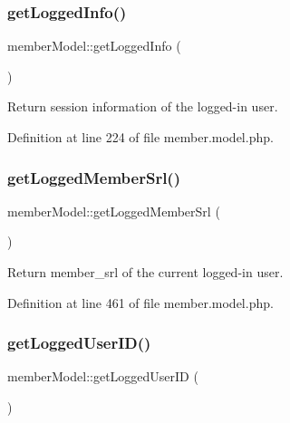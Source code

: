 \subsubsection{\texorpdfstring{get\+Logged\+Info()}{getLoggedInfo()}}
{\footnotesize\ttfamily member\+Model\+::get\+Logged\+Info (\begin{DoxyParamCaption}{ }\end{DoxyParamCaption})}



Return session information of the logged-\/in user. 



Definition at line 224 of file member.\+model.\+php.

\mbox{\label{classmemberModel_ae5d9411d53ee2b5fb7e101125db26c1d}} 
\subsubsection{\texorpdfstring{get\+Logged\+Member\+Srl()}{getLoggedMemberSrl()}}
{\footnotesize\ttfamily member\+Model\+::get\+Logged\+Member\+Srl (\begin{DoxyParamCaption}{ }\end{DoxyParamCaption})}



Return member\+\_\+srl of the current logged-\/in user. 



Definition at line 461 of file member.\+model.\+php.

\mbox{\label{classmemberModel_a72fc4779b5efef6ff8fc238e85628d01}} 
\subsubsection{\texorpdfstring{get\+Logged\+User\+I\+D()}{getLoggedUserID()}}
{\footnotesize\ttfamily member\+Model\+::get\+Logged\+User\+ID (\begin{DoxyParamCaption}{ }\end{DoxyParamCaption})}



